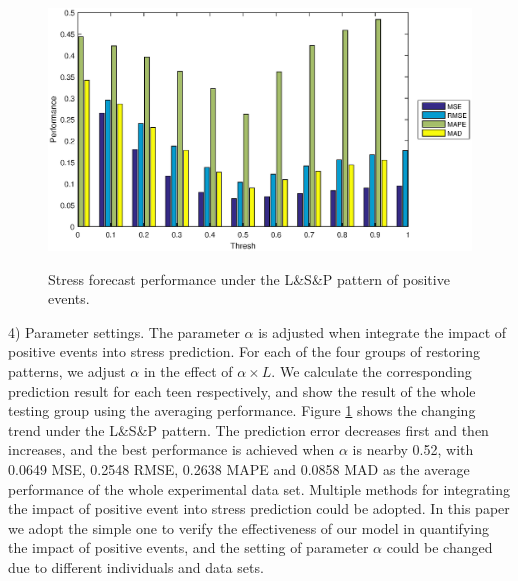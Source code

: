 \begin{figure}
\centering
\caption{Stress forecast performance under the L\&S\&P pattern of positive events.}
\includegraphics[width=\linewidth]{figs/threshNew.eps}
\label{fig:thresh}
\end{figure}

4) Parameter settings.
The parameter $\alpha$ is adjusted when integrate the impact of positive events into stress prediction.
For each of the four groups of restoring patterns,
we adjust $\alpha$ in the effect of $\alpha \times L$.
We calculate the corresponding prediction result for each teen respectively,
and show the result of the whole testing group using the averaging performance.
Figure \ref{fig:thresh} shows the changing trend under the L\&S\&P pattern.
The prediction error decreases first and then increases,
and the best performance is achieved when $\alpha$ is nearby 0.52,
with 0.0649 MSE, 0.2548 RMSE, 0.2638 MAPE and 0.0858 MAD as the average performance of the whole experimental data set.
Multiple methods for integrating the impact of positive event into stress prediction could be adopted.
In this paper we adopt the simple one to verify the effectiveness of our model in quantifying the impact of positive events,
and the setting of parameter $\alpha$ could be changed due to different individuals and data sets.





